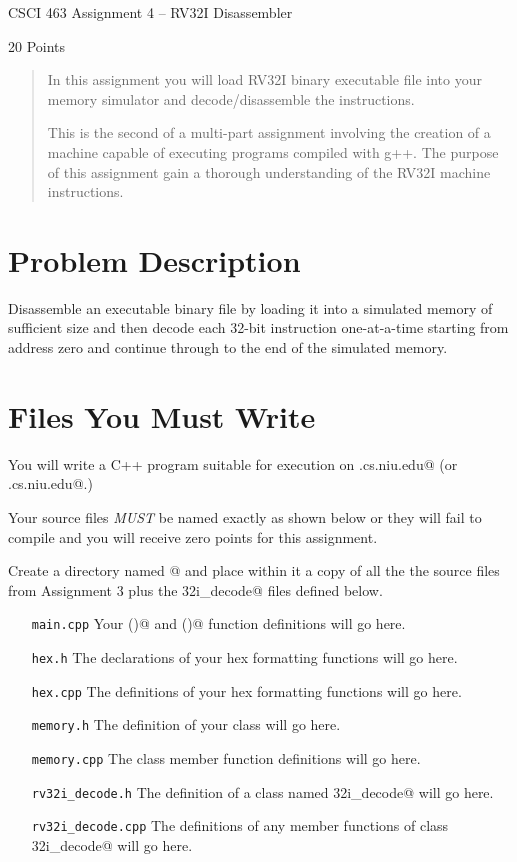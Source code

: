 \documentclass[11pt]{article}
\newcommand\MyTitle{CSCI 463 Assignment 4 -- RV32I Disassembler}
\begin{document}
 
\thispagestyle{plain}
\centerline{\huge\MyTitle}
\vspace{.2in}
\centerline{20 Points}

\begin{abstract}
\noindent In this assignment you will load RV32I binary executable file
into your memory simulator and decode/disassemble the instructions.

This is the second of a multi-part assignment involving the creation of a machine 
capable of executing programs compiled with g++.
The purpose of this assignment gain a thorough understanding of the RV32I 
machine instructions.
\end{abstract}

\section{Problem Description}

Disassemble an executable binary file by loading it into a simulated
memory of sufficient size and then decode each 32-bit instruction one-at-a-time
starting from address zero and continue through to the end of the simulated 
memory. 

\section{Files You Must Write}

You will write a C++ program suitable for execution on 
\verb@hopper.cs.niu.edu@ (or \verb@turing.cs.niu.edu@.)

Your source files {\em MUST} be named exactly as shown below or they will 
fail to compile and you will receive zero points for this assignment.

Create a directory named @ and place within it a copy of all the
the source files from Assignment 3 plus the \verb@rv32i_decode@  files defined below.

\begin{itemize}[leftmargin=1in]
\item[\tt main.cpp] Your \verb@main()@ and \verb@usage()@ function definitions will go here.
\item[\tt hex.h] The declarations of your hex formatting functions will go here.
\item[\tt hex.cpp] The definitions of your hex formatting functions will go here.
\item[\tt memory.h] The definition of your \verb@memory@ class will go here.
\item[\tt memory.cpp] The \verb@memory@ class member function definitions will go here.

\item [\tt rv32i\_decode.h] The definition of a class named \verb@rv32i_decode@ will go here.
\item [\tt rv32i\_decode.cpp] The definitions of any member functions of class \verb@rv32i_decode@ will go here.
\end{itemize}
\end{document}
